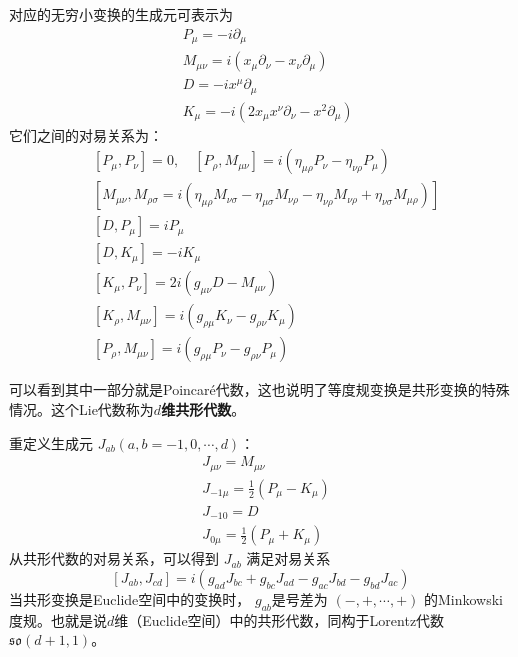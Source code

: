 	对应的无穷小变换的生成元可表示为
	\begin{equation}
		\boxed{
		\begin{aligned} &P_{\mu}=-i \partial_{\mu} \\ &M_{\mu \nu}=i\left(x_{\mu} \partial_{\nu}-x_{\nu} \partial_{\mu}\right) \\\ &D=-i x^{\mu} \partial_{\mu} \\ &K_{\mu}=-i\left(2 x_{\mu} x^{\nu} \partial_{\nu}-x^{2} \partial_{\mu}\right)  
		\end{aligned}
	}
	\end{equation}
	它们之间的对易关系为：
	\begin{equation}
		\boxed{
				\begin{aligned} 
					&[P_\mu,P_\nu]=0,\quad[P_\rho,M_{\mu\nu}]=i(\eta_{\mu\rho}P_\nu-\eta_{\nu\rho} P_\mu)\\
					&[M_{\mu\nu},M_{\rho\sigma}=i\left(\eta_{\mu\rho}M_{\nu\sigma}-\eta_{\mu\sigma}M_{\nu\rho}-\eta_{\nu\rho}M_{\nu\rho}+\eta_{\nu\sigma}M_{\mu\rho}\right)]\\
					&\left[D, P_{\mu}\right]=i P_{\mu}\\ &\left[D, K_{\mu}\right]=-i K_{\mu} \\ &\left[K_{\mu}, P_{\nu}\right]=2 i\left(g_{\mu \nu} D-M_{\mu \nu}\right) \\ &\left[K_{\rho}, M_{\mu \nu}\right]=i\left(g_{\rho \mu} K_{\nu}-g_{\rho \nu} K_{\mu}\right) \\ &\left[P_{\rho}, M_{\mu \nu}\right]=i\left(g_{\rho \mu} P_{\nu}-g_{\rho \nu} P_{\mu}\right) 
			\end{aligned}
		
		}
	\end{equation}
	
	可以看到其中一部分就是Poincar\'e代数，这也说明了等度规变换是共形变换的特殊情况。这个Lie代数称为\textbf{$ d $维共形代数}。
	
	重定义生成元 $J_{ab} (a,b=-1,0,\cdots,d )$：
	\begin{align} &J_{\mu \nu}=M_{\mu \nu}\\ &J_{-1 \mu}=\frac{1}{2}\left(P_{\mu}-K_{\mu}\right) \\ &J_{-10}=D \\ &J_{0 \mu}=\frac{1}{2}\left(P_{\mu}+K_{\mu}\right)  \end{align}
	从共形代数的对易关系，可以得到 $J_{ab}$ 满足对易关系
	\begin{equation}
		\left[J_{a b}, J_{c d}\right]=i\left(g_{a d} J_{b c}+g_{b c} J_{a d}-g_{a c} J_{b d}-g_{b d} J_{a c}\right)
	\end{equation}
	当共形变换是Euclide空间中的变换时， $g_{ab} $是号差为 $(-,+, \cdots,+)$ 的Minkowski度规。也就是说$d$维（Euclide空间）中的共形代数，同构于Lorentz代数$\mathfrak{so}(d+1,1) $。
	
